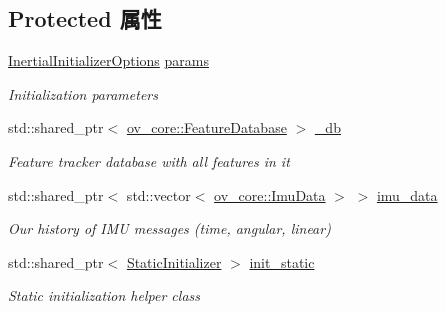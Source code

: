 \subsection*{Protected 属性}
\begin{DoxyCompactItemize}
\item 
\mbox{\label{classov__init_1_1InertialInitializer_aa2a83ab908985ccb9f89dd6613fb203c}} 
\hyperlink{structov__init_1_1InertialInitializerOptions}{Inertial\+Initializer\+Options} \hyperlink{classov__init_1_1InertialInitializer_aa2a83ab908985ccb9f89dd6613fb203c}{params}
\begin{DoxyCompactList}\small\item\em Initialization parameters \end{DoxyCompactList}\item 
\mbox{\label{classov__init_1_1InertialInitializer_a3968041a4da5cf43774845bd1782707d}} 
std\+::shared\+\_\+ptr$<$ \hyperlink{classov__core_1_1FeatureDatabase}{ov\+\_\+core\+::\+Feature\+Database} $>$ \hyperlink{classov__init_1_1InertialInitializer_a3968041a4da5cf43774845bd1782707d}{\+\_\+db}
\begin{DoxyCompactList}\small\item\em Feature tracker database with all features in it \end{DoxyCompactList}\item 
\mbox{\label{classov__init_1_1InertialInitializer_a41bba4e8e0bb529ca90bd80a0cbe77d4}} 
std\+::shared\+\_\+ptr$<$ std\+::vector$<$ \hyperlink{structov__core_1_1ImuData}{ov\+\_\+core\+::\+Imu\+Data} $>$ $>$ \hyperlink{classov__init_1_1InertialInitializer_a41bba4e8e0bb529ca90bd80a0cbe77d4}{imu\+\_\+data}
\begin{DoxyCompactList}\small\item\em Our history of I\+MU messages (time, angular, linear) \end{DoxyCompactList}\item 
\mbox{\label{classov__init_1_1InertialInitializer_a89f3e90f16c4c42407696a11701f6db3}} 
std\+::shared\+\_\+ptr$<$ \hyperlink{classov__init_1_1StaticInitializer}{Static\+Initializer} $>$ \hyperlink{classov__init_1_1InertialInitializer_a89f3e90f16c4c42407696a11701f6db3}{init\+\_\+static}
\begin{DoxyCompactList}\small\item\em Static initialization helper class \end{DoxyCompactList}\item 

\end{DoxyCompactItemize}
